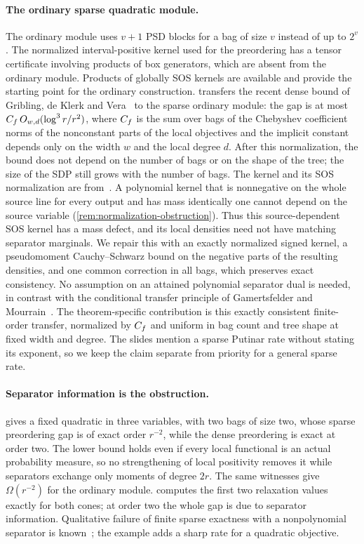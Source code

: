 \paragraph{The ordinary sparse quadratic module.}
The ordinary module uses $v+1$ PSD blocks for a bag of size $v$ instead of
up to $2^v$. The normalized interval-positive kernel used for the
preordering has a tensor certificate involving products of box generators,
which are absent from the ordinary module. Products of globally SOS kernels
are available and provide the starting point for the ordinary construction.
 transfers the recent dense bound of Gribling, de Klerk and
Vera~\cite{gribling2026-squared-kernels} to the sparse ordinary module: the
gap is at most $C_f\,O_{w,d}(\log^3r/r^2)$, where $C_f$ is the sum over bags
of the Chebyshev coefficient norms of the nonconstant parts of the local
objectives and the implicit constant depends only on the width $w$ and the
local degree $d$. After this normalization, the bound does not depend on
the number of bags or on the shape of the tree; the size of the SDP still
grows with the number of bags. The kernel and its SOS normalization are
from~\cite{gribling2026-squared-kernels}. A polynomial kernel that is
nonnegative on the whole source line for every output and has mass
identically one cannot depend on the source variable
(\cref{rem:normalization-obstruction}). Thus this source-dependent SOS kernel
has a mass defect, and its local densities need not have matching separator
marginals. We repair this with an
exactly normalized signed kernel, a pseudomoment Cauchy--Schwarz bound on
the negative parts of the resulting densities, and one common correction
in all bags, which preserves exact consistency. No assumption on an
attained polynomial separator dual is needed, in contrast with the
conditional transfer principle of Gamertsfelder and
Mourrain~\cite{gamertsfelder2025-countable-gmp}. The theorem-specific
contribution is this exactly consistent finite-order transfer, normalized by $C_f$ and uniform in bag count and tree shape at
fixed width and degree. The slides mention a sparse Putinar rate without
stating its exponent, so we keep the claim separate from priority for a
general sparse rate.

\paragraph{Separator information is the obstruction.}
 gives a fixed quadratic in three variables, with two
bags of size two, whose sparse preordering gap is of exact order $r^{-2}$,
while the dense preordering is exact at order two. The lower bound holds even
if every local functional is an actual probability measure, so no
strengthening of local positivity removes it while separators exchange only
moments of degree $2r$. The same witnesses give $\Omega(r^{-2})$ for the
ordinary module.  computes the first two relaxation
values exactly for both cones; at order two the whole gap is due to
separator information. Qualitative failure of finite sparse exactness with
a nonpolynomial separator is known~\cite{nie2026-sparse-tightness}; the
example adds a sharp rate for a quadratic objective.

